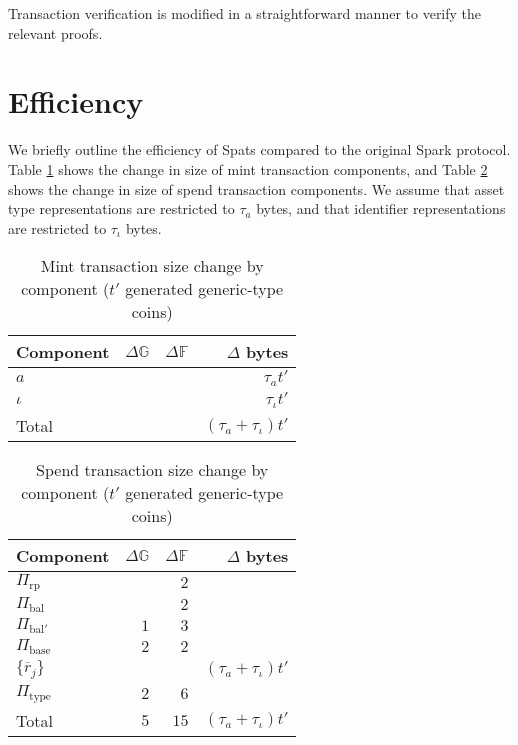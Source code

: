 \documentclass{article}
\newcommand{\G}{\mathbb{G}}
\newcommand{\F}{\mathbb{F}}
\begin{document}
Transaction verification is modified in a straightforward manner to verify the relevant proofs.


\section{Efficiency}

We briefly outline the efficiency of Spats compared to the original Spark protocol.
Table \ref{table:size_mint} shows the change in size of mint transaction components, and Table \ref{table:size_spend} shows the change in size of spend transaction components.
We assume that asset type representations are restricted to $\tau_a$ bytes, and that identifier representations are restricted to $\tau_\iota$ bytes.

\begin{table}[ht]
    \centering
    \begin{tabular}{|l|r|r|r|}
    \hline
    \textbf{Component} & \textbf{$\Delta\G$} & \textbf{$\Delta\F$} & \textbf{$\Delta$ bytes} \\
    \hline
    $a$ & &  & $\tau_a t'$ \\
    $\iota$ & &  & $\tau_\iota t'$ \\
    \hline
    Total & & & $(\tau_a + \tau_\iota) t'$ \\
    \hline
    \end{tabular}
    \caption{Mint transaction size change by component ($t'$ generated generic-type coins)}
    \label{table:size_mint}
\end{table}

\begin{table}[ht]
    \centering
    \begin{tabular}{|l|r|r|r|}
    \hline
    \textbf{Component} & \textbf{$\Delta\G$} & \textbf{$\Delta\F$} & \textbf{$\Delta$ bytes} \\
    \hline
    $\Pi_{\text{rp}}$ & & $2$ & \\
    $\Pi_{\text{bal}}$ & & $2$ & \\
    $\Pi_{\text{bal}'}$ & $1$ & $3$ & \\
    $\Pi_{\text{base}}$ & $2$ & $2$ & \\
    $\{\overline{r}_j\}$ & & & $(\tau_a + \tau_\iota) t'$ \\
    $\Pi_{\text{type}}$ & $2$ & $6$ & \\
    \hline
    Total & $5$ & $15$ & $(\tau_a + \tau_\iota) t'$ \\
    \hline
    \end{tabular}
    \caption{Spend transaction size change by component ($t'$ generated generic-type coins)}
    \label{table:size_spend}
\end{table}
\end{document}
